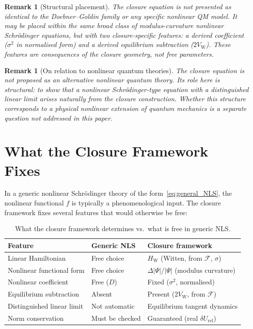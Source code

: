 \documentclass[12pt]{article}
\newtheorem{remark}[theorem]{Remark}
\newcommand{\Fcal}{\mathcal{F}}
\newcommand{\VW}{V_{\mathrm{W}}}
\newcommand{\HW}{H_{\mathrm{W}}}
\newcommand{\dUrel}{\delta U_{\mathrm{rel}}}
\begin{document}
\begin{remark}[Structural placement]
The closure equation is not presented as identical to the Doebner--Goldin family or any specific nonlinear QM model. It may be placed within the same broad class of modulus-curvature nonlinear Schr\"odinger equations, but with two closure-specific features: a derived coefficient ($\sigma^2$ in normalised form) and a derived equilibrium subtraction ($2\VW$). These features are consequences of the closure geometry, not free parameters.
\end{remark}

\begin{remark}[On relation to nonlinear quantum theories]
The closure equation is not proposed as an alternative nonlinear quantum theory. Its role here is structural: to show that a nonlinear Schr\"odinger-type equation with a distinguished linear limit arises naturally from the closure construction. Whether this structure corresponds to a physical nonlinear extension of quantum mechanics is a separate question not addressed in this paper.
\end{remark}

\section{What the Closure Framework Fixes}\label{sec:fixed}

In a generic nonlinear Schr\"odinger theory of the form~\eqref{eq:general_NLS}, the nonlinear functional $f$ is typically a phenomenological input. The closure framework fixes several features that would otherwise be free:

\begin{table}[ht]
\centering
\caption{What the closure framework determines vs.\ what is free in generic NLS.}
\label{tab:fixed}
\begin{tabular}{@{}lll@{}}
\toprule
Feature & Generic NLS & Closure framework \\
\midrule
Linear Hamiltonian & Free choice & $\HW$ (Witten, from $\Fcal$, $\sigma$) \\
Nonlinear functional form & Free choice & $\Delta|\Psi|/|\Psi|$ (modulus curvature) \\
Nonlinear coefficient & Free ($D$) & Fixed ($\sigma^2$, normalised) \\
Equilibrium subtraction & Absent & Present ($2\VW$, from $\Fcal$) \\
Distinguished linear limit & Not automatic & Equilibrium tangent dynamics \\
Norm conservation & Must be checked & Guaranteed (real $\dUrel$) \\
\bottomrule
\end{tabular}
\end{table}
\end{document}
